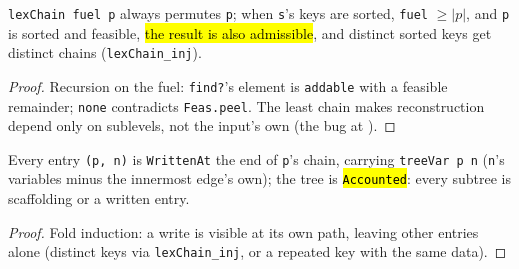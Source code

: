 \begin{theorem}
\label{thm:lvl-lexchain-spec}
\leanok
{}
 \texttt{lexChain fuel p} always permutes \texttt{p}; when \texttt{s}'s keys are
sorted, \texttt{fuel} $\ge |p|$, and \texttt{p} is sorted and feasible, \hl{the result is also
admissible}, and distinct sorted keys get distinct chains (\texttt{lexChain\_inj}).
\end{theorem}
\begin{proof}
\leanok
{} Recursion on the fuel: \texttt{find?}'s element is \texttt{addable} with a feasible
remainder; \texttt{none} contradicts \texttt{Feas.peel}. The least chain makes reconstruction depend
only on sublevels, not the input's own (the bug at ).
\end{proof}

\begin{theorem}
\label{thm:lvl-totree-spec}
\leanok
{}
 Every entry \texttt{(p, n)} is \texttt{WrittenAt} the end of \texttt{p}'s chain,
carrying \texttt{treeVar p n} (\texttt{n}'s variables minus the innermost edge's own); the tree is
\hl{\texttt{Accounted}}: every subtree is scaffolding or a written entry.
\end{theorem}
\begin{proof}
\leanok
{} Fold induction: a write is visible at its own path, leaving other entries alone (distinct
keys via \texttt{lexChain\_inj}, or a repeated key with the same data).
\end{proof}

